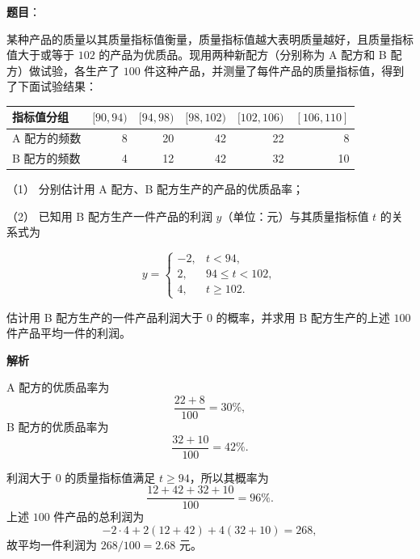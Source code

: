 \begin{answer}

\textbf{题目}：

某种产品的质量以其质量指标值衡量，质量指标值越大表明质量越好，且质量指标值大于或等于 $102$ 的产品为优质品。现用两种新配方（分别称为 A 配方和 B 配方）做试验，各生产了 $100$ 件这种产品，并测量了每件产品的质量指标值，得到了下面试验结果：

\begin{center}
\begin{tabular}{lrrrrr}
\toprule
指标值分组 & $[90,94)$ & $[94,98)$ & $[98,102)$ & $[102,106)$ & $[106,110]$ \\
\midrule
A 配方的频数 & 8 & 20 & 42 & 22 & 8 \\
B 配方的频数 & 4 & 12 & 42 & 32 & 10 \\
\bottomrule
\end{tabular}
\end{center}

（1） 分别估计用 A 配方、B 配方生产的产品的优质品率；

（2） 已知用 B 配方生产一件产品的利润 $y$（单位：元）与其质量指标值 $t$ 的关系式为

\nopagebreak[4]
\[
y=\begin{cases}
-2,&t<94,\\
2,&94\leq t<102,\\
4,&t\geq102.
\end{cases}
\]

估计用 B 配方生产的一件产品利润大于 $0$ 的概率，并求用 B 配方生产的上述 $100$ 件产品平均一件的利润。

\textbf{解析}


A 配方的优质品率为
\nopagebreak[4]
\[
\frac{22+8}{100}=30\%,
\]
B 配方的优质品率为
\nopagebreak[4]
\[
\frac{32+10}{100}=42\%.
\]


利润大于 $0$ 的质量指标值满足 $t\geq94$，所以其概率为
\nopagebreak[4]
\[
\frac{12+42+32+10}{100}=96\%.
\]
上述 $100$ 件产品的总利润为
\nopagebreak[4]
\[
-2\cdot4+2(12+42)+4(32+10)=268,
\]
故平均一件利润为 $268/100=2.68$ 元。



\end{answer}
